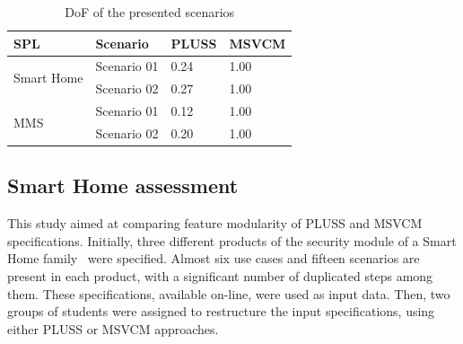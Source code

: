 \documentclass{sig-alt-full}
\begin{document}
\begin{table}[htb]
\centering
\caption{DoF of the presented scenarios}
\label{tab:scenario-dof}
\begin{small}
\begin{tabular}{llll} \hline
SPL							&	Scenario		& PLUSS	& MSVCM	\\ \hline
\multirow{2}{*}{Smart Home} &	Scenario 01		& 0.24  & 1.00  \\
							&	Scenario 02		& 0.27  & 1.00  \\ \hline
\multirow{2}{*}{MMS} 		&	Scenario 01		& 0.12  & 1.00  \\ 
							&	Scenario 02		& 0.20  & 1.00  \\ \hline
\end{tabular}
\end{small}
\end{table}

\subsection{Smart Home assessment}

This study aimed at comparing feature modularity of PLUSS and MSVCM
specifications. Initially, three different products of the security module of a
Smart Home family~\cite{Pohl:2005aa} were specified. Almost six use cases and
fifteen scenarios are present in each product, with a significant number of
duplicated steps among them. These specifications, available on-line, were used
as input data. Then, two groups of students were assigned to restructure the
input specifications, using either PLUSS or MSVCM approaches. 


\end{document}

